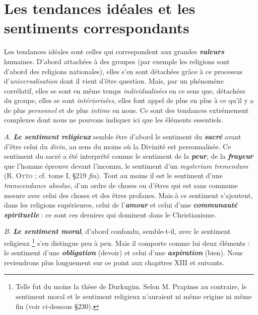 
\section{Les tendances idéales et les sentiments correspondants}
Les tendances idéales sont celles qui correspondent aux grandes
\textbf{\textit {valeurs}} humaines. D’abord attachées à des groupes (par exemple les
religions sont d’abord des religions nationales), elles s’en sont détachées
grâce à ce processus d’{\it universalisation} dont il vient d’être question.
Mais, par un phénomène corrélatif, elles se sont en même temps
{\it individualisées} en ce sens que, détachées du groupe, elles se sont
{\it intériorisées}, elles font appel de plus en plus à ce qu’il y a de plus
{\it personnel} et de plus {\it intime} en nous. Ce sont des tendances extrémement
complexes dont nous ne pouvons indiquer ici que les éléments
essentiels.

{\it A}. \textbf{\textit {Le sentiment religieux}} semble être d’abord le sentiment du
\textbf{\textit {sacré}} avant d’être celui du {\it divin}, au sens du moins où la Divinité
est personnalisée. Ce sentiment du sacré a été interprété comme le
sentiment de la \textbf{\textit {peur}}, de la \textbf{\textit {frayeur}}
que l’homme éprouve devant
l'inconnu, le sentiment d’un {\it mysterium tremendum} (R. \textsc{Otto} ; cf. tome I,
\S 219 {\it fin}). Tout au moins il est le sentiment d’une {\it transcendance
absolue}, d’un ordre de choses ou d’êtres qui est sans commune mesure
avec celui des choses et des êtres profanes. Mais.à ce sentiment
s’ajoutent, dans les religions supérieures, celui de l’\textbf{\textit {amour}} et celui
d’une \textbf{\textit {communauté spirituelle}} : ce sont ces derniers qui dominent
dans le Christianisme.

{\it B}. \textbf{\textit {Le sentiment moral}}, d’abord confondu, semble-t-il, avec le sentiment
religieux \footnote{Telle fut du moins la thèse de Durkugim. Selon M. Prapinss au
contraire, le
sentiment moral et le sentiment religieux n'auraient ni même erigine ni même fin (voir
ci-dessous \S 230).}
s’en distingue peu à peu. Mais il comporte comme
lui deux éléments : le sentiment d’une \textbf{\textit {obligation}} (devoir) et celui
d’une \textbf{\textit {aspiration}} (bien). Nous reviendrons plus longuement sur ce
point aux chapitres XIII et suivants.

